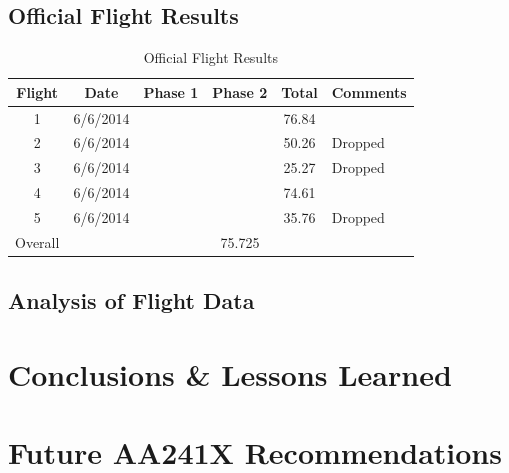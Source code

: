 \documentclass[11pt]{article}
\begin{document}
	\subsection{Official Flight Results}
	\label{OffFltRes}
	\begin{table}[!ht]
		\begin{center}
			\begin{tabular}{ | c | c | c | c | c | p{3cm} |}
				\hline
				\textbf{Flight} & \textbf{Date} & \textbf{Phase 1} & \textbf{Phase 2} & \textbf{Total} & \textbf{Comments} \\ \hline
				1 & 6/6/2014 &  &  & 76.84 & \\ \hline
				2 & 6/6/2014 &  &  & 50.26 & Dropped\\ \hline
				3 & 6/6/2014 &  &  & 25.27 & Dropped\\ \hline
				4 & 6/6/2014 &  &  & 74.61 & \\ \hline
				5 & 6/6/2014 &  &  & 35.76 & Dropped\\ \hline
				Overall & \multicolumn{5}{c|}{75.725}\\ \hline   
			\end{tabular}
			\caption{Official Flight Results}
			\label{flighttab}
		\end{center}
	\end{table}

	\subsection{Analysis of Flight Data}
	\label{AnalFltData}


\section{Conclusions \& Lessons Learned}
	\label{Conclusion}

\section{Future AA241X Recommendations}
	\label{Recommendations}
\end{document}
